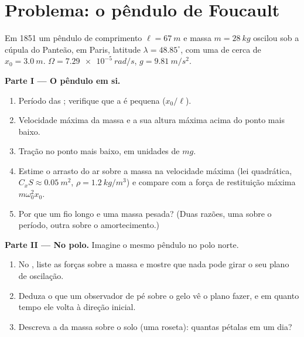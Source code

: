 \section{Problema: o pêndulo de Foucault}

\begin{problem}
\label{pb:b1:non-inertial-frames:1}
Em 1851 um pêndulo de comprimento $\ell = \qty{67}{m}$ e massa $m = \qty{28}{kg}$
oscilou sob a cúpula do Panteão, em Paris, latitude $\lambda =
48.85^\circ$, com uma  de cerca de $x_0 = \qty{3.0}{m}$. $\Omega =
\qty{7.29e-5}{rad/s}$, $g = \qty{9.81}{m/s^2}$.

\medskip
\noindent\textbf{Parte I --- O pêndulo em si.}
\begin{enumerate}
  \item Período das ; verifique que a  é
        pequena ($x_0/\ell$).
  \item Velocidade máxima da massa e a sua altura máxima acima do ponto
        mais baixo.
  \item Tração no ponto mais baixo, em unidades de $mg$.
  \item Estime o arrasto do ar sobre a massa na velocidade máxima (lei
        quadrática, $C_xS \approx \qty{0.05}{m^2}$, $\rho = \qty{1.2}{kg/m^3}$) e
        compare com a força de restituição máxima $m\omega_0^2x_0$.
  \item Por que um fio longo e uma massa pesada? (Duas razões, uma sobre o
        período, outra sobre o amortecimento.)
\end{enumerate}

\medskip
\noindent\textbf{Parte II --- No polo.}
Imagine o mesmo pêndulo no polo norte.
\begin{enumerate}[resume]
  \item No , liste as forças sobre a massa e mostre
        que nada pode girar o seu plano de oscilação.
  \item Deduza o que um observador de pé sobre o gelo vê o plano fazer, e
        em quanto tempo ele volta à direção inicial.
  \item Descreva a  da massa sobre o solo (uma roseta): quantas
        pétalas em um dia?
\end{enumerate}


\end{problem}
